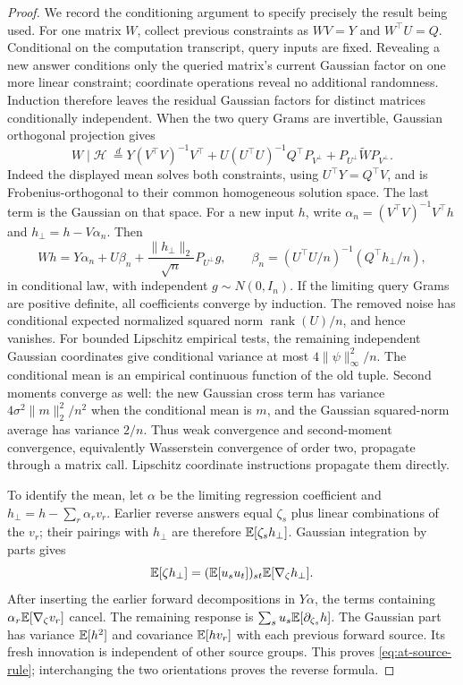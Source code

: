 \begin{proof}
We record the conditioning argument to specify precisely the result being
used.  For one matrix $W$, collect previous constraints as $WV=Y$ and
$W^\top U=Q$.  Conditional on the computation transcript, query inputs
are fixed.  Revealing a new answer conditions only the queried matrix's
current Gaussian factor on one more linear constraint; coordinate
operations reveal no additional randomness.  Induction therefore leaves
the residual Gaussian factors for distinct matrices conditionally
independent.  When the two query Grams are invertible, Gaussian
orthogonal projection gives
\[
 W\mid\mathcal H\ \overset d=
 Y(V^\top V)^{-1}V^\top+
 U(U^\top U)^{-1}Q^\top P_{V^\perp}
 +P_{U^\perp}\widetilde W P_{V^\perp}.
\]
Indeed the displayed mean solves both constraints, using
$U^\top Y=Q^\top V$, and is Frobenius-orthogonal to their common
homogeneous solution space.  The last term is the Gaussian on that space.
For a new input $h$, write
$\alpha_n=(V^\top V)^{-1}V^\top h$ and $h_\perp=h-V\alpha_n$.
Then
\[
 Wh=Y\alpha_n+U\beta_n+
       \frac{\|h_\perp\|_2}{\sqrt n}P_{U^\perp}g,\qquad
 \beta_n=(U^\top U/n)^{-1}(Q^\top h_\perp/n),
\]
in conditional law, with independent $g\sim N(0,I_n)$.
If the limiting query Grams are positive definite, all coefficients
converge by induction.  The removed noise has conditional expected
normalized squared norm $\operatorname{rank}(U)/n$, and hence vanishes.
For bounded Lipschitz empirical tests, the remaining independent Gaussian
coordinates give conditional variance at most $4\|\psi\|_\infty^2/n$.
The conditional mean is an empirical continuous function of the old
tuple.  Second moments converge as well: the new Gaussian cross term
has variance $4\sigma^2\|m\|_2^2/n^2$ when the conditional mean is $m$,
and the Gaussian squared-norm average has variance $2/n$.
Thus weak convergence and second-moment convergence, equivalently
Wasserstein convergence of order two, propagate through a matrix call.
Lipschitz coordinate instructions propagate them directly.

To identify the mean, let $\alpha$ be the limiting regression coefficient
and $h_\perp=h-\sum_r\alpha_rv_r$.  Earlier reverse answers equal
$\zeta_s$ plus linear combinations of the $v_r$; their pairings with
$h_\perp$ are therefore $\mathbb{E}[\zeta_sh_\perp]$.
Gaussian integration by parts gives
\[
 \mathbb{E}[\zeta h_\perp]=(\mathbb{E}[u_su_t])_{st}\mathbb{E}[\nabla_\zeta h_\perp].
\]
After inserting the earlier forward decompositions in $Y\alpha$,
the terms containing $\alpha_r\mathbb{E}[\nabla_\zeta v_r]$ cancel.
The remaining response is $\sum_su_s\mathbb{E}[\partial_{\zeta_s}h]$.
The Gaussian part has variance $\mathbb{E}[h^2]$ and covariance $\mathbb{E}[hv_r]$
with each previous forward source.  Its fresh innovation is independent
of other source groups.  This proves \eqref{eq:at-source-rule};
interchanging the two orientations proves the reverse formula.


\end{proof}
